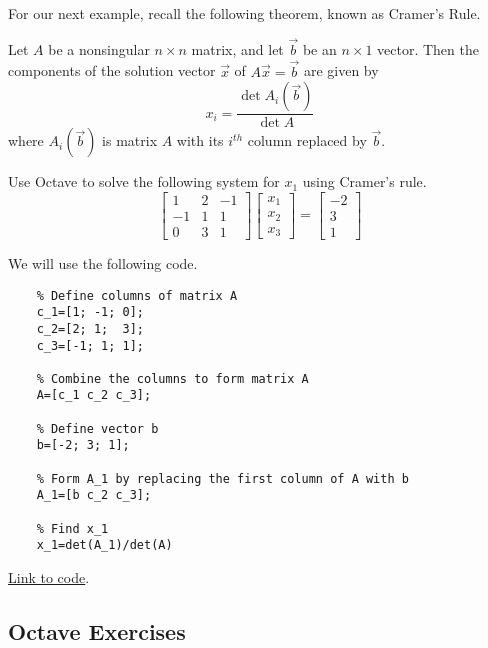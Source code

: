 \documentclass{ximera}
\begin{document}
For our next example, recall the following theorem, known as Cramer's Rule.

\begin{theorem}[\ref{th:cramer}]
  Let $A$ be a nonsingular $n\times n$ matrix, and let $\vec{b}$ be an $n\times 1$ vector.  Then the components of the solution vector $\vec{x}$ of $A\vec{x}=\vec{b}$ are given by
  $$x_i=\frac{\det{A_i(\vec{b})}}{\det{A}}$$
  where $A_i(\vec{b})$ is matrix $A$ with its $i^{th}$ column replaced by $\vec{b}$.
  \end{theorem}

\begin{example}\label{ex_oct_det_cramer}
Use Octave to solve the following system for $x_1$ using Cramer's rule.
$$\begin{bmatrix}1&2&-1\\-1&1&1\\0&3&1\end{bmatrix}\begin{bmatrix}x_1\\x_2\\x_3\end{bmatrix}=\begin{bmatrix}-2\\3\\1\end{bmatrix}$$
\begin{explanation}
  We will use the following code.
  \begin{verbatim}
    % Define columns of matrix A
    c_1=[1; -1; 0];
    c_2=[2; 1;  3];
    c_3=[-1; 1; 1];

    % Combine the columns to form matrix A
    A=[c_1 c_2 c_3];

    % Define vector b
    b=[-2; 3; 1];

    % Form A_1 by replacing the first column of A with b
    A_1=[b c_2 c_3];

    % Find x_1
    x_1=det(A_1)/det(A)
  \end{verbatim}

  \href{https://sagecell.sagemath.org/?z=eJxdj8EKgzAMhu9C3yEXYR7Gph6lh7LhS8gQW-ssWDtqt7m3X-Ick0FT2j_J9ycxnHVnRg3KDXc7TuA6sE3wZgbBIlWnvEoL2GMcLwUJGa-yAvAP-UfIeUVpOiSwKIaTs5KYof9xg4POebuBC14hHxCJkX9713EeWgXnQbJIIh8d8w2_JJDAXvkCr29Do8x4Xdw646ewetIqAp4m9IQRtIr8dyvN2MJcpyzCi7c67LAuOSyP5A0Xv09o&lang=octave&interacts=eJyLjgUAARUAuQ==}{Link to code}.
\end{explanation}
\end{example}

\subsection*{Octave Exercises}
\end{document}
